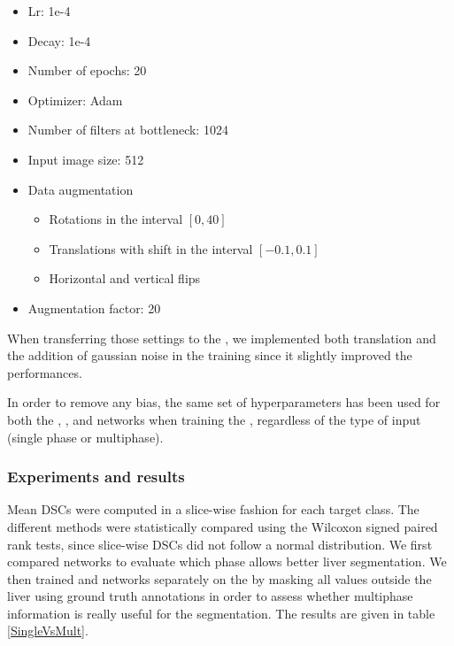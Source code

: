 \begin{itemize}
	\item Lr: 1e-4
	\item Decay: 1e-4
	\item Number of epochs: 20
	\item Optimizer: Adam
	\item Number of filters at bottleneck: 1024
	\item Input image size: 512
	\item Data augmentation
	\begin{itemize}
		\item Rotations in the interval $ \left[0, 40\right] $
		\item Translations with shift in the interval $ \left[-0.1, 0.1\right] $
		\item Horizontal and vertical flips
	\end{itemize}
	\item Augmentation factor: 20
\end{itemize}

When transferring those settings to the \textbf{}, 
we implemented both translation and the addition of gaussian
noise in the training since it slightly improved the performances.

In order to remove any bias, the same set of hyperparameters has been
used for both the , ,  and
 networks when training the \textbf{}, regardless of the
type of input (single phase or multiphase).

\subsubsection{Experiments and results}

Mean DSCs were computed in a slice-wise fashion for each target class. 
The different methods were statistically compared using the Wilcoxon 
signed paired rank tests, since slice-wise DSCs did not follow a normal distribution. 
We first compared  networks
 to evaluate which phase allows better liver segmentation. 
 We then trained  and   networks separately on the  by masking all values outside the liver using ground truth annotations in order to assess whether multiphase information is really useful for the segmentation. The results are given in table \ref{SingleVsMult}.

